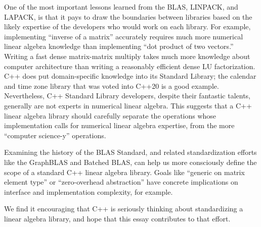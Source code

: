 One of the most important lessons learned from the BLAS, LINPACK, and
LAPACK, is that it pays to draw the boundaries between libraries based
on the likely expertise of the developers who would work on each
library.  For example, implementing ``inverse of a matrix'' accurately
requires much more numerical linear algebra knowledge than
implementing ``dot product of two vectors.''  Writing a fast dense
matrix-matrix multiply takes much more knowledge about computer
architecture than writing a reasonably efficient dense LU
factorization.  C++ does put domain-specific knowledge into its
Standard Library; the calendar and time zone library \cite{P0355r7}
that was voted into C++20 is a good example.  Nevertheless, C++
Standard Library developers, despite their fantastic talents,
generally are not experts in numerical linear algebra.  This suggests
that a C++ linear algebra library should carefully separate the
operations whose implementation calls for numerical linear algebra
expertise, from the more ``computer science-y'' operations.

Examining the history of the BLAS Standard, and related
standardization efforts like the GraphBLAS and Batched BLAS, can help
us more consciously define the scope of a standard C++ linear algebra
library.  Goals like ``generic on matrix element type'' or
``zero-overhead abstraction'' have concrete implications on interface
and implementation complexity, for example.

We find it encouraging that C++ is seriously thinking about
standardizing a linear algebra library, and hope that this essay
contributes to that effort.


